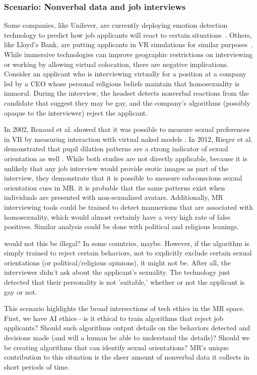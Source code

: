 \subsubsection{Scenario: Nonverbal data and job interviews}
Some companies, like Unilever, are currently deploying emotion detection technology to predict how job applicants will react to certain situations~\cite{gilliland}. Others, like Lloyd's Bank, are putting applicants in VR simulations for similar purposes~\cite{guardian2018how}. While immersive technologies can improve geographic restrictions on interviewing or working by allowing virtual colocation, there are negative implications. Consider an applicant who is interviewing virtually for a position at a company led by a CEO whose personal religious beliefs maintain that homosexuality is immoral. During the interview, the headset detects nonverbal reactions from the candidate that suggest they may be gay, and the company's algorithms (possibly opaque to the interviewer) reject the applicant.

In 2002, Renaud et al. showed that it was possible to measure sexual preferences in VR by measuring interaction with virtual naked models \cite{renaud}. In 2012, Rieger et al. demonstrated that pupil dilation patterns are a strong indicator of sexual orientation as well \cite{rieger}. While both studies are not directly applicable, because it is unlikely that any job interview would provide erotic images as part of the interview, they demonstrate that it is possible to measure subconscious sexual orientation cues in MR. it is probable that the same patterns exist when individuals are presented with non-sexualized avatars. Additionally, MR interviewing tools could be trained to detect mannerisms that are associated with homosexuality, which would almost certainly have a very high rate of false positives. Similar analysis could be done with political and religious leanings.

would not this be illegal? In some countries, maybe. However, if the algorithm is simply trained to reject certain behaviors, not to explicitly exclude certain sexual orientations (or political/religious opinions), it might not be. After all, the interviewer didn't ask about the applicant's sexuality. The technology just detected that their personality is not 'suitable,' whether or not the applicant is gay or not.

This scenario highlights the broad intersections of tech ethics in the MR space. First, we have AI ethics---is it ethical to train algorithms that reject job applicants? Should such algorithms output details on the behaviors detected and decisions made (and will a human be able to understand the details)? Should we be creating algorithms that can identify sexual orientations? MR's unique contribution to this situation is the sheer amount of nonverbal data it collects in short periods of time.

